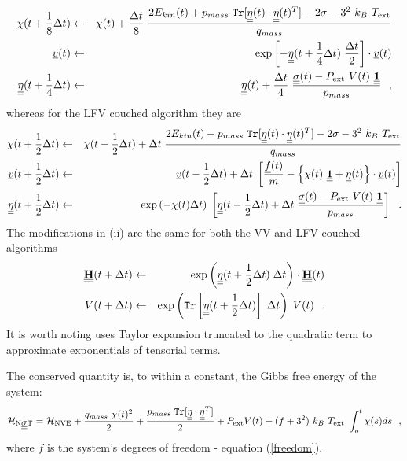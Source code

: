 \begin{eqnarray}
\chi (t + {1 \over 8} \Delta t) &\leftarrow& \chi (t) + {\Delta t \over 8} \;
{{2 E_{kin}(t) + p_{mass}~{\tt Tr}[\mbox{$\underline{\underline{\bf \eta}}$}(t) \cdot
\mbox{$\underline{\underline{\bf \eta}}$}(t)^{T}] - 2 \sigma - 3^{2}~k_{B}~T_{\rm ext}} \over q_{mass}} \nonumber \\
\mbox{$\underline{v}$}(t) &\leftarrow& \exp \left[ - \mbox{$\underline{\underline{\bf \eta}}$}(t + {1 \over 4}\Delta t) \;
{\Delta t \over 2} \right] \cdot \mbox{$\underline{v}$}(t) \\
\mbox{$\underline{\underline{\bf \eta}}$}(t + {1 \over 4} \Delta t) &\leftarrow& \mbox{$\underline{\underline{\bf \eta}}$}(t) +
{\Delta t \over 4} \; \frac{\mbox{$\underline{\underline{\bf \sigma}}$}(t) - P_{\rm ext}~V(t)~\mbox{$\underline{\underline{\bf 1}}$}}{p_{mass}}~~, \nonumber
\end{eqnarray}
whereas for the LFV couched algorithm they are
\begin{eqnarray}
\chi (t + {1 \over 2} \Delta t) &\leftarrow& \chi (t - {1 \over 2} \Delta t) + \Delta t \;
{{2 E_{kin}(t) + p_{mass}~{\tt Tr}[\mbox{$\underline{\underline{\bf \eta}}$}(t) \cdot \mbox{$\underline{\underline{\bf \eta}}$}(t)^{T}] -
2 \sigma - 3^{2}~k_{B}~T_{\rm ext}} \over q_{mass}} \nonumber \\
\mbox{$\underline{v}$}(t + {1 \over 2} \Delta t) &\leftarrow& \mbox{$\underline{v}$}(t - {1 \over 2} \Delta t) + \Delta t \;
\left[{\mbox{$\underline{f}$}(t) \over m} - \left\{ \chi(t)~\mbox{$\underline{\underline{\bf 1}}$} +
\mbox{$\underline{\underline{\bf \eta}}$}(t) \right\} \cdot \mbox{$\underline{v}$}(t) \right] \\
\mbox{$\underline{\underline{\bf \eta}}$}(t + {1 \over 2} \Delta t) &\leftarrow& \exp \left( -\chi (t) \Delta t \right) \;
\left[ \mbox{$\underline{\underline{\bf \eta}}$}(t - {1 \over 2} \Delta t) + \Delta t \;
\frac{\mbox{$\underline{\underline{\bf \sigma}}$}(t) - P_{\rm ext}~ V(t)~\mbox{$\underline{\underline{\bf 1}}$}}{p_{mass}} \right]~~. \nonumber
\end{eqnarray}
The modifications in (ii) are the same for both the VV and LFV
couched algorithms
\begin{eqnarray}
\mbox{$\underline{\underline{\bf H}}$}(t + \Delta t) &\leftarrow& \exp \left( \mbox{$\underline{\underline{\bf \eta}}$}(t + {1 \over 2} \Delta t) \;
\Delta t \right) \cdot \mbox{$\underline{\underline{\bf H}}$}(t) \nonumber \\
V(t + \Delta t) &\leftarrow& \exp \left({\tt Tr}
\left[ \mbox{$\underline{\underline{\bf \eta}}$}(t + {1 \over 2} \Delta t) \right] \; \Delta t \right) \; V(t)~~.
\end{eqnarray}
It is worth noting \D uses Taylor expansion truncated to the
quadratic term to approximate exponentials of tensorial terms.

The conserved quantity is, to within a constant, the Gibbs free energy
of the system:
\begin{equation}
{\cal H}_{\rm N\mbox{$\underline{\underline{\bf \sigma}}$}T} = {\cal H}_{\rm NVE} + {q_{mass}~\chi (t)^{2} \over 2} +
{p_{mass}~{\tt Tr}[\mbox{$\underline{\underline{\bf \eta}}$} \cdot \mbox{$\underline{\underline{\bf \eta}}$}^{T}] \over 2} + P_{\rm ext} V(t) +
(f+3^{2})~k_{B}~T_{\rm ext}~\int_o^t \chi (s) ds~~,
\end{equation}
where $f$ is the system's degrees of freedom - equation
(\ref{freedom}).

